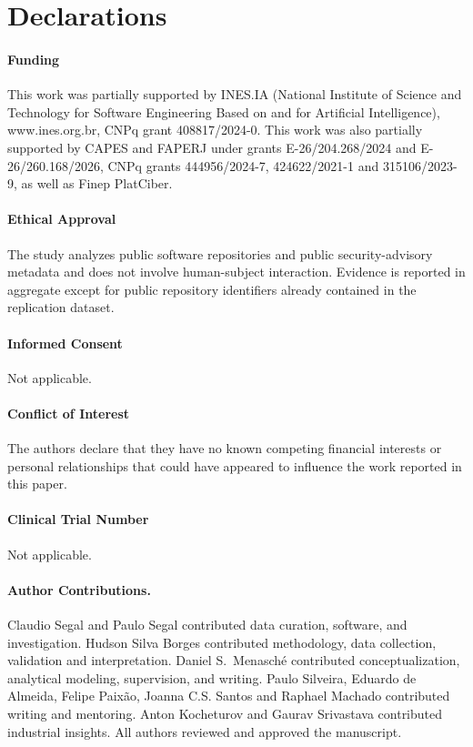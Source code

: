 \documentclass[smallextended,natbib]{svjour3}
\begin{document}
\section*{Declarations}

\paragraph{Funding}
This work was partially supported by INES.IA (National Institute of Science and Technology for Software Engineering Based on and for Artificial Intelligence), www.ines.org.br, CNPq grant 408817/2024-0. This work was also partially supported by CAPES and FAPERJ under grants E-26/204.268/2024 and E-26/260.168/2026, CNPq grants 444956/2024-7, 424622/2021-1 and 315106/2023-9, as well as Finep PlatCiber.

\paragraph{Ethical Approval}
The study analyzes public software repositories and public security-advisory
metadata and does not involve human-subject interaction.  Evidence is reported
in aggregate except for public repository identifiers already contained in the
replication dataset.

\paragraph{Informed Consent}
 Not applicable.

\paragraph{Conflict of Interest}
The authors declare that they have no known competing financial interests or personal relationships that could have appeared to influence the work reported in this paper.

\paragraph{Clinical Trial Number}
Not applicable.

\paragraph{Author Contributions.}
Claudio Segal and Paulo Segal contributed data curation, software, and
investigation.  Hudson Silva Borges   contributed  methodology, data collection,
validation   and interpretation.  Daniel S.\ Menasch\'e contributed
conceptualization, analytical modeling, supervision, and writing. Paulo Silveira, Eduardo de Almeida, Felipe Paixão, Joanna C.S. Santos    and Raphael Machado  contributed writing and mentoring. Anton Kocheturov and  Gaurav Srivastava contributed   industrial insights. All authors
reviewed and approved the manuscript.



\end{document}
